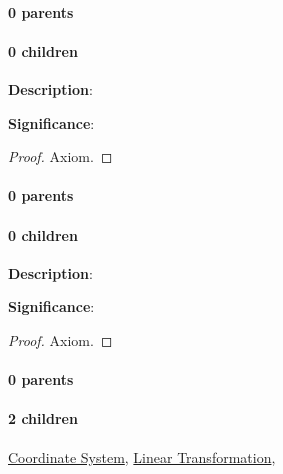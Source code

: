 \documentclass[../main.tex]{subfiles}
\begin{document}
\paragraph{0 parents} 
\paragraph{0 children} 



\begin{statement}
\label{statement:Surjection}\hspace*{0pt}\par
\end{statement}
\textbf{Description}:{\color{red} \todo}\par
{\color{magenta} \textbf{Significance}:{\color{red} \todo}\par}
\begin{proof}Axiom.\end{proof}\par
\paragraph{0 parents} 
\paragraph{0 children} 



\begin{statement}
\label{statement:Bijection}\hspace*{0pt}\par
\end{statement}
\textbf{Description}:{\color{red} \todo}\par
{\color{magenta} \textbf{Significance}:{\color{red} \todo}\par}
\begin{proof}Axiom.\end{proof}\par
\paragraph{0 parents} 
\paragraph{2 children} \hyperref[statement:Coordinate System]{Coordinate System}, \hyperref[statement:Linear Transformation]{Linear Transformation}, 
\end{document}
